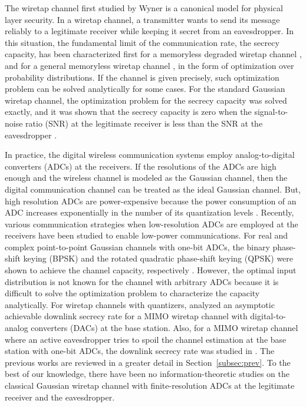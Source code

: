 \documentclass[journal]{IEEEtran}
\begin{document}
The wiretap channel first studied by Wyner \cite{wyner} is a canonical model for physical layer security.
In a wiretap channel, a transmitter wants to send its message reliably to a legitimate receiver while keeping it secret from an eavesdropper.
In this situation, the fundamental limit of the communication rate, the secrecy capacity, has been characterized first for a memoryless degraded wiretap channel \cite{wyner}, and for a general memoryless wiretap channel \cite{secrecycapacity}, in the form of optimization over probability distributions.
If the channel is given precisely, such optimization problem can be solved analytically for some cases.
For the standard Gaussian wiretap channel, the optimization problem for the secrecy capacity was solved exactly, and it was shown that the secrecy capacity is zero when the signal-to-noise ratio (SNR) at the legitimate receiver is less than the SNR at the eavesdropper \cite{gaussianwiretap,Mimowiretap}. 

In practice, the digital wireless communication systems employ analog-to-digital converters (ADCs) at the receivers. If the resolutions of the ADCs are high enough and the wireless channel is modeled as the Gaussian channel, then the digital communication channel can be treated as the ideal Gaussian channel.
But, high resolution ADCs are power-expensive because the power consumption of an ADC increases exponentially in the number of its quantization levels \cite{ADCpower}. Recently, various communication strategies when low-resolution ADCs are employed at the receivers have been studied to enable low-power communications.
For real and complex point-to-point Gaussian channels with one-bit ADCs, the binary phase-shift keying (BPSK) and the rotated quadratic phase-shift keying (QPSK) were shown to achieve the channel capacity, respectively \cite{p2pADC,MIMO_onebit_capacity}. However, the optimal input distribution is not known for the channel with arbitrary ADCs because it is difficult to solve the optimization problem to characterize the capacity analytically.  For wiretap channels with quantizers, \cite{MIMO_DAC} analyzed an asymptotic achievable downlink secrecy rate for a MIMO wiretap channel with digital-to-analog converters (DACs) at the base station. Also, for a MIMO wiretap channel where an active eavesdropper tries to spoil the channel estimation at the base station with one-bit ADCs, the downlink secrecy rate was studied in \cite{Downlink_One_bit_MIMO}. The previous works are reviewed in a greater detail in Section~\ref{subsec:prev}. To the best of our knowledge, there have been no  information-theoretic studies on the classical Gaussian wiretap channel with finite-resolution ADCs at the legitimate receiver and the eavesdropper. 
\end{document}
